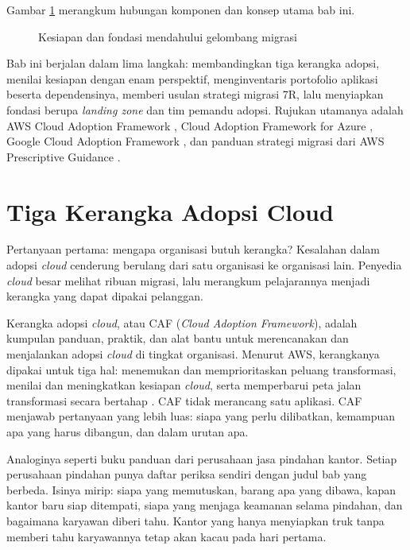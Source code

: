 Gambar \ref{fig:ch04-memilah-portofolio} merangkum hubungan komponen dan konsep utama bab ini.
\begin{figure}[!htb]
  \centering
  
  \caption{Kesiapan dan fondasi mendahului gelombang migrasi}
  \label{fig:ch04-memilah-portofolio}
\end{figure}

Bab ini berjalan dalam lima langkah: membandingkan tiga kerangka adopsi, menilai
kesiapan dengan enam perspektif, menginventaris portofolio aplikasi beserta
dependensinya, memberi usulan strategi migrasi 7R, lalu menyiapkan fondasi berupa
\textit{landing zone} dan tim pemandu adopsi. Rujukan utamanya adalah AWS Cloud Adoption
Framework \cite{awscaf}, Cloud Adoption Framework for Azure \cite{azurecaf}, Google Cloud
Adoption Framework \cite{googlecaf}, dan panduan strategi migrasi dari AWS Prescriptive
Guidance \cite{aws7r}.

\section{Tiga Kerangka Adopsi Cloud}
\label{sec:ch04-tiga-kerangka}

Pertanyaan pertama: mengapa organisasi butuh kerangka? Kesalahan dalam adopsi
\textit{cloud} cenderung berulang dari satu organisasi ke organisasi lain. Penyedia
\textit{cloud} besar melihat ribuan migrasi, lalu merangkum pelajarannya menjadi kerangka
yang dapat dipakai pelanggan.

Kerangka adopsi \textit{cloud}, atau CAF (\textit{Cloud Adoption Framework}), adalah
kumpulan panduan, praktik, dan alat bantu untuk merencanakan dan menjalankan adopsi
\textit{cloud} di tingkat organisasi. Menurut AWS, kerangkanya dipakai untuk tiga hal:
menemukan dan memprioritaskan peluang transformasi, menilai dan meningkatkan kesiapan
\textit{cloud}, serta memperbarui peta jalan transformasi secara bertahap \cite{awscaf}.
CAF tidak merancang satu aplikasi. CAF menjawab pertanyaan yang lebih luas: siapa yang
perlu dilibatkan, kemampuan apa yang harus dibangun, dan dalam urutan apa.

Analoginya seperti buku panduan dari perusahaan jasa pindahan kantor. Setiap perusahaan
pindahan punya daftar periksa sendiri dengan judul bab yang berbeda. Isinya mirip: siapa
yang memutuskan, barang apa yang dibawa, kapan kantor baru siap ditempati, siapa yang
menjaga keamanan selama pindahan, dan bagaimana karyawan diberi tahu. Kantor yang hanya
menyiapkan truk tanpa memberi tahu karyawannya tetap akan kacau pada hari pertama.

